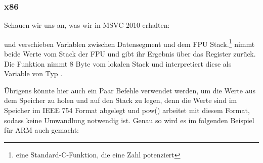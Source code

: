\subsubsection{x86}
Schauen wir uns an, was wir in MSVC 2010 erhalten:



\FLD und \FSTP verschieben Variablen zwischen Datensegment und dem FPU
Stack.\footnote{eine Standard-C-Funktion, die eine Zahl potenziert}
nimmt beide Werte vom Stack der FPU und gibt ihr Ergebnis über das  Register zurück. 
Die Funktion \printf nimmt 8 Byte vom lokalen Stack und interpretiert diese als
Variable von Typ \Tdouble.

Übrigens könnte hier auch ein Paar \MOV Befehle verwendet werden, um die Werte
aus dem Speicher zu holen und auf den Stack zu legen, denn die Werte sind im
Speicher im IEEE 754 Format abgelegt und pow() arbeitet mit diesem Format,
sodass keine Umwandlung notwendig ist.
Genau so wird es im folgenden Beispiel für ARM auch
gemacht:
